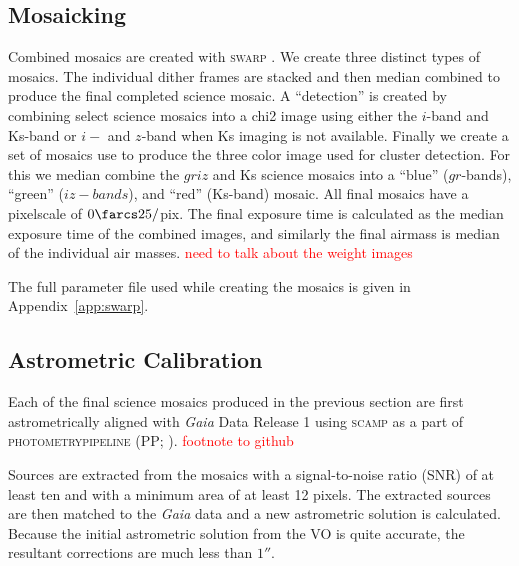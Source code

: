 \documentclass[apj, revtex4]{emulateapj}
\newcommand{\editorial}[1]{\textcolor{red}{#1}}
\begin{document}
\subsection{Mosaicking}\label{sec:mosaicks}
Combined mosaics are created with \textsc{swarp} \citep{Bertin2002}. We create three distinct types of mosaics. The individual dither frames are stacked and then median combined to produce the final completed science mosaic. A ``detection'' is created by combining select science mosaics into a chi2 image using either the $i$-band and Ks-band or $i-$ and $z$-band when Ks imaging is not available. Finally we create a set of mosaics use to produce the three color image used for cluster detection. For this we median combine the $griz$ and Ks science mosaics into a ``blue'' ($gr$-bands), ``green'' ($iz-bands$), and ``red'' (Ks-band) mosaic. All final mosaics have a pixelscale of $0\farcs25/$pix. The final exposure time is calculated as the median exposure time of the combined images, and similarly the final airmass is median of the individual air masses. \editorial{need to talk about the weight images}

The full parameter file used while creating the mosaics is given in Appendix~\ref{app:swarp}.

\subsection{Astrometric Calibration}
Each of the final science mosaics produced in the previous section are first astrometrically aligned with \textit{Gaia} \citep{GaiaCollaboration2016} Data Release 1 \citep{GaiaCollaboration2016a} using \textsc{scamp} \citep{Bertin2006} as a part of \textsc{photometrypipeline} (PP; \citealt{Mommert2017}). \editorial{footnote to github}

Sources are extracted from the mosaics with a signal-to-noise ratio (SNR) of at least ten and with a minimum area of at least 12 pixels. The extracted sources are then matched to the \textit{Gaia} data and a new astrometric solution is calculated. Because the initial astrometric solution from the VO is quite accurate, the resultant corrections are much less than $1''$.
\end{document}
